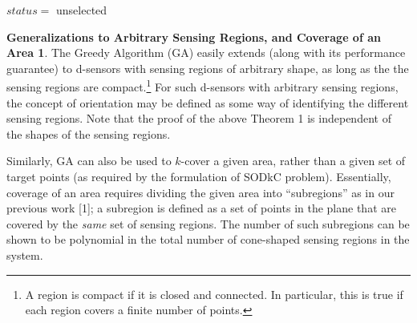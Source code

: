 \documentclass[conference]{IEEEtran}
\theoremstyle{definition}
\newtheorem*{Generalizations_to_Arbitrary}{Generalizations to Arbitrary Sensing Regions, and
Coverage of an Area}
\newtheorem*{NP-Hardness of Approximating the SODkC Problem}{NP-Hardness of Approximating the SODkC Problem}
\newtheorem*{Greedy Algorithm (GA)}{Greedy Algorithm (GA)}
\newtheorem*{GA on the Running Example}{GA on the Running Example}
\newtheorem*{Performance Guarantee of GA}{Performance Guarantee of GA}
\begin{document}
\begin{algorithm}
    \caption{Distributed GA (algorithm of each d-sensor) — Selecting and orienting d-sensors for $k$-coverage}

    $status = $ unselected\;
    
\end{algorithm}

\begin{Generalizations_to_Arbitrary}
The Greedy Algorithm (GA) easily extends (along with its performance guarantee) to d-sensors with sensing regions of arbitrary shape, as long as the the sensing regions are compact.\footnote{A region is compact if it is closed and connected. In particular, this is true if each region covers a finite number of points.} For such d-sensors with arbitrary sensing regions, the concept of orientation may be defined as some way of identifying the different sensing regions. Note that the proof of the above Theorem 1 is independent of the shapes of the sensing regions.
\end{Generalizations_to_Arbitrary}

Similarly, GA can also be used to $k$-cover a given area, rather than a given set of target points (as required by the formulation of SODkC problem). Essentially, coverage of an area requires dividing the given area into “subregions” as in our previous work [1]; a subregion is defined as a set of points in the plane that are covered by the \textit{same} set of sensing regions. The number of such subregions can be shown to be polynomial in the total number of cone-shaped sensing regions in the system.
\end{document}
